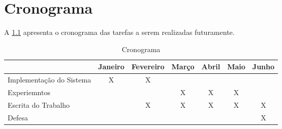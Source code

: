 \chapter{Cronograma}

A \cref{tabela:cronograma} apresenta o cronograma das tarefas a serem realizadas futuramente.

\begin{table}[]
	\captionsetup{justification=centering}
	\caption{Cronograma}
	\label{tabela:cronograma}
	\begin{tabular}{|l|c|c|c|c|c|c|}
		\hline
		& Janeiro & Fevereiro & Março & Abril & Maio & Junho \\ \hline
		Implementação do Sistema & X       & X         &       &       &      &       \\ \hline
		Experiemntos             &         &           & X     & X     & X    &       \\ \hline
		Escrita do Trabalho      &         & X         & X     & X     & X    & X     \\ \hline
		Defesa                   &         &           &       &       &      & X     \\ \hline
	\end{tabular}
\end{table}